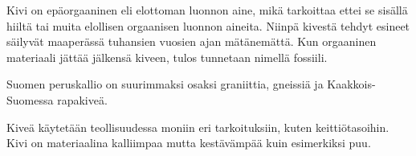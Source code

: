 Kivi on ep{\"a}orgaaninen eli elottoman luonnon aine, mik{\"a} tarkoittaa ettei se
sis{\"a}ll{\"a} hiilt{\"a} tai muita elollisen orgaanisen luonnon aineita. Niinp{\"a} kivest{\"a}
tehdyt esineet s{\"a}ilyv{\"a}t maaper{\"a}ss{\"a} tuhansien vuosien ajan m{\"a}t{\"a}nem{\"a}tt{\"a}. Kun
orgaaninen materiaali j{\"a}tt{\"a}{\"a} j{\"a}lkens{\"a} kiveen, tulos tunnetaan nimell{\"a} fossiili.

Suomen peruskallio on suurimmaksi osaksi graniittia, gneissi{\"a} ja
Kaakkois-Suomessa rapakive{\"a}.

Kive{\"a} k{\"a}ytet{\"a}{\"a}n teollisuudessa moniin eri tarkoituksiin, kuten keitti{\"o}tasoihin.
Kivi on materiaalina kalliimpaa mutta kest{\"a}v{\"a}mp{\"a}{\"a} kuin esimerkiksi puu.
\fi
